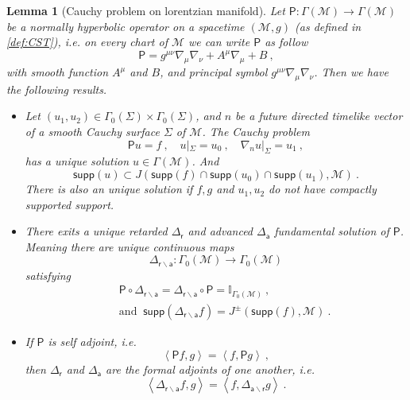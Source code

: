 \documentclass[10pt]{book}
\newcommand{\supp}{\mathsf{supp}}
\newcommand{\sm}[1]{\left\langle#1\right\rangle}
\newcommand{\Mcal}{\mathcal{M}}
\newcommand{\Ibb}{\mathbb{I}}
\newcommand{\Psf}{\mathsf{P}}
\newcommand{\asf}{\mathsf{a}}
\newcommand{\rsf}{\mathsf{r}}
\theoremstyle{break}
\newtheorem{lemma}{Lemma}
\begin{document}
\begin{lemma}[Cauchy problem on lorentzian manifold]\label{lem:cauchy_pb}
Let $\Psf : \Gamma(\Mcal) \to \Gamma(\Mcal)$ be a normally hyperbolic operator on a spacetime $(\Mcal,g)$ (as defined in \ref{def:CST}), i.e. on every chart of $\Mcal$ we can write $\Psf$ as follow
%
\begin{equation*}
\Psf = g^{\mu\nu} \nabla_\mu \nabla_\nu + A^\mu \nabla_\mu + B \ ,
\end{equation*}
%
with smooth function $A^\mu$ and $B$, and principal symbol $g^{\mu\nu} \nabla_\mu \nabla_\nu$. Then we have the following results.
%
\begin{itemize}
\item Let $(u_1,u_2) \in \Gamma_0(\Sigma) \times \Gamma_0(\Sigma)$, and $n$ be a future directed timelike vector of a smooth Cauchy surface $\Sigma$ of $\Mcal$. The Cauchy problem
%
\begin{equation*}
\Psf u = f \ , \quad u|_\Sigma = u_0 \ , \quad \nabla_n u |_\Sigma = u_1 \ ,
\end{equation*}
%
has a unique solution $u \in \Gamma(\Mcal)$. And
%
\begin{equation*}
\supp(u) \subset J\left( \supp(f) \cap \supp(u_0) \cap \supp(u_1) , \Mcal \right) \ .
\end{equation*}
%
There is also an unique solution if $f, g$ and $u_1,u_2$ do not have compactly supported support.

\item There exits a unique retarded $\Delta_\rsf$ and advanced $\Delta_\asf$ fundamental solution of $\Psf$. Meaning there are unique continuous maps 
%
\begin{equation*}
\Delta_{\rsf\backslash\asf} : \Gamma_0(\Mcal) \to \Gamma_0(\Mcal)  
\end{equation*}
%
satisfying 
%
\begin{eqnarray*}
&& \Psf \circ \Delta_{\rsf\backslash\asf} = \Delta_{\rsf\backslash\asf} \circ \Psf = \Ibb_{\Gamma_0(\Mcal)} \ , \\
&& \mbox{and } \ \supp(\Delta_{\rsf\backslash\asf} f) = J^{\pm} \left(\supp(f) , \Mcal\right) \ .
\end{eqnarray*}

\item If $\Psf$ is self adjoint, i.e. 
%
\begin{equation*}
\sm{\Psf f,g} = \sm{f,\Psf g} \ ,
\end{equation*}
%
then $\Delta_\rsf$ and $\Delta_\asf$ are the formal adjoints of one another, i.e.
%
\begin{equation*}
\sm{\Delta_{\rsf\backslash\asf} f , g} = \sm{f , \Delta_{\asf\backslash\rsf} g} \ . 
\end{equation*}


\end{itemize}
\end{lemma}
\end{document}
